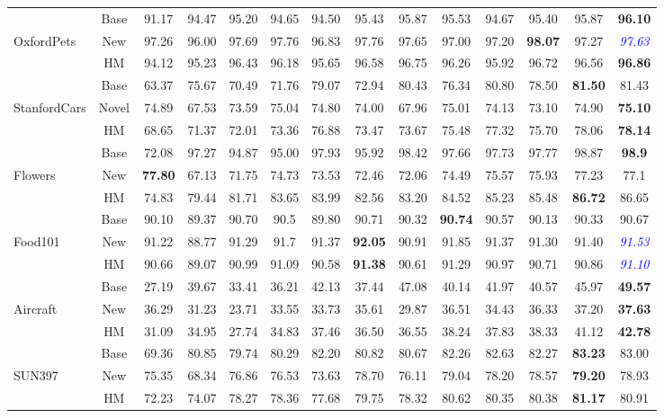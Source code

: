 \documentclass[11pt]{article}
\begin{document}
\begin{table}[htbp]
{\begin{tabular}{lc|ccccccccccc|c}
 \midrule
 & Base&  91.17&94.47& 95.20& 94.65& 94.50& 95.43& 95.87& 95.53& 94.67& 95.40& 95.87&\textbf{96.10}\\
 OxfordPets& New&  97.26&96.00& 97.69& 97.76& 96.83& 97.76& 97.65& 97.00& 97.20& \textbf{98.07}& 97.27&\textcolor{blue}{\textit{97.63}}\\
 & HM&  94.12&95.23& 96.43& 96.18& 95.65& 96.58& 96.75& 96.26& 95.92& 96.72& 96.56&\textbf{96.86}\\
 \midrule
 & Base& 63.37& 75.67& 70.49& 71.76& 79.07& 72.94& 80.43& 76.34& 80.80& 78.50& \textbf{81.50}&81.43\\
 StanfordCars& Novel& 74.89& 67.53& 73.59& 75.04& 74.80& 74.00& 67.96& 75.01& 74.13& 73.10& 74.90&\textbf{75.10}\\
 & HM& 68.65& 71.37& 72.01& 73.36& 76.88& 73.47& 73.67& 75.48& 77.32& 75.70& 78.06&\textbf{78.14}\\
 \midrule
 & Base&  72.08&97.27& 94.87& 95.00& 97.93& 95.92& 98.42& 97.66& 97.73& 97.77& 98.87&\textbf{98.9}\\
 Flowers& New&  \textbf{77.80}&67.13& 71.75& 74.73& 73.53& 72.46& 72.06& 74.49& 75.57& 75.93& 77.23&77.1\\
 & HM&  74.83&79.44& 81.71& 83.65& 83.99& 82.56& 83.20& 84.52& 85.23& 85.48& \textbf{86.72}&86.65\\
 \midrule
 & Base&  90.10&89.37& 90.70& 90.5& 89.80& 90.71& 90.32& \textbf{90.74}& 90.57& 90.13& 90.33&90.67\\
 Food101& New&  91.22&88.77& 91.29& 91.7& 91.37& \textbf{92.05}& 90.91& 91.85& 91.37& 91.30& 91.40&\textcolor{blue}{\textit{91.53}}\\
 & HM&  90.66&89.07& 90.99& 91.09& 90.58& \textbf{91.38}& 90.61& 91.29& 90.97& 90.71& 90.86&\textcolor{blue}{\textit{91.10}}\\
 \midrule
 & Base&  27.19&39.67& 33.41& 36.21& 42.13& 37.44& 47.08& 40.14& 41.97& 40.57& 45.97&\textbf{49.57}\\
 Aircraft& New&  36.29&31.23& 23.71& 33.55& 33.73& 35.61& 29.87& 36.51& 34.43& 36.33& 37.20&\textbf{37.63}\\
 & HM&  31.09&34.95& 27.74& 34.83& 37.46& 36.50& 36.55& 38.24& 37.83& 38.33& 41.12&\textbf{42.78}\\
 \midrule
 & Base&  69.36&80.85& 79.74& 80.29& 82.20& 80.82& 80.67& 82.26& 82.63& 82.27& \textbf{83.23}&83.00\\
 SUN397& New&  75.35&68.34& 76.86& 76.53& 73.63& 78.70& 76.11& 79.04& 78.20& 78.57& \textbf{79.20}&78.93\\
 & HM&  72.23&74.07& 78.27& 78.36& 77.68& 79.75& 78.32& 80.62& 80.35& 80.38& \textbf{81.17}&80.91\\

\end{tabular}}
\end{table}
\end{document}
